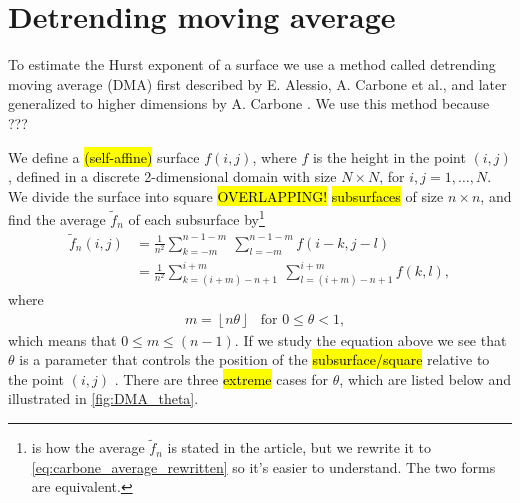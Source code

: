 \section{Detrending moving average}
To estimate the Hurst exponent of a surface we use a method called detrending moving average (DMA) first described by E. Alessio, A. Carbone et al.\cite{alessio2002dma}, and later generalized to higher dimensions by A. Carbone \cite{carbone2007algorithm}. We use this method because ??? 


We define a \hl{(self-affine)} surface $f(i,j)$, where $f$ is the height in the point $(i,j)$, defined in a discrete 2-dimensional domain with size $N\times N$, for $i,j = 1,\dots,N$. We divide the surface into square \hl{OVERLAPPING!} \hl{subsurfaces} of size $n \times n$, and find the average $\tilde f_n$ of each subsurface by\footnote{ is how the average $\tilde f_n$ is stated in the article\cite{carbone2007algorithm}, but we rewrite it to \cref{eq:carbone_average_rewritten} so it's easier to understand. The two forms are equivalent.} 
\begin{align}
    \tilde f_n(i,j) 
    &= \frac{1}{n^2}\sum_{k=-m}^{n-1-m} ~ \sum_{l=-m}^{n-1-m} f(i-k, j-l) \label{eq:carbone_average}\\
    &= \frac{1}{n^2} \sum_{k=(i+m)-n+1}^{i+m} ~ \sum_{l=(i+m)-n+1}^{i+m} f(k, l), \label{eq:carbone_average_rewritten}
\end{align}
where
\begin{align*}
    &m = \left \lfloor n\theta \right \rfloor &\text{for }0 \leq \theta < 1,
\end{align*}
which means that $0 \leq m \leq (n-1)$. If we study the equation above we see that $\theta$ is a parameter that controls the position of the \hl{subsurface/square} relative to the point $(i,j)$%
. There are three \hl{extreme} cases for $\theta$, which are listed below and illustrated in \cref{fig:DMA_theta}.%
%
